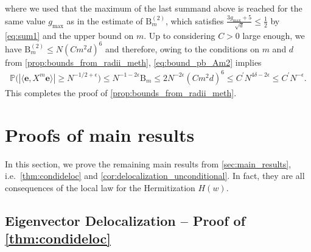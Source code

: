 \documentclass[10pt,a4paper]{amsart}
\numberwithin{equation}{section}
\begin{document}
where we used that the maximum of the last summand above is reached for the same value $g_{\max} $ as in the estimate of $\mathrm{B}_m^{(2)}$, which satisfies $\frac{3g_{\max}+ 5}{\sqrt{d}} \le \frac{1}{2}$ by \cref{eq:sum1} and the upper bound on $m$.  Up to considering $C>0$ large enough, we have $\mathrm{B}_{m}^{(2)} \le N(Cm ^2d)^6$ and therefore, owing to the conditions on $m$ and $d$ from \cref{prop:bounds_from_radii_meth}, 
\cref{eq:bound_pb_Am2} implies
\begin{align*}
    \mathbb{P} \bigl( |\langle \mathbf e, X^m \mathbf e \rangle| \ge N^{-1/2+ \epsilon} \bigr)\le N^{-1-2\epsilon} {\mathrm{B}_{m}}\le 2N^{-2\epsilon} {(Cm^2 d)^6}  \le C^{\prime}  N^{4\delta - 2 \epsilon} \le C^\prime N^{-\epsilon}.
\end{align*}
This completes the proof of \cref{prop:bounds_from_radii_meth}. 

	\section{Proofs of main results} 
	
	In this section, we prove the remaining main results from \cref{sec:main_results}, i.e.\ 
	\cref{thm:condideloc} and \cref{cor:delocalization_unconditional}. 
	In fact, they are all consequences of the local law for the Hermitization $H(w)$. 
	
	
	\subsection{Eigenvector Delocalization -- Proof of \cref{thm:condideloc}} \label{sec:proof_delocalization} 
\end{document}
